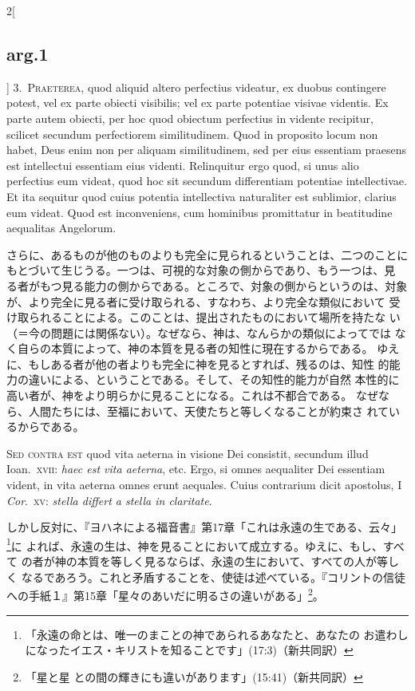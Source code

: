 \documentclass[paper=a4paper,fontsize=10pt,jafontsize=9pt,titlepage]{jlreq}
\begin{document}
\begin{paracol}{2}[\subsection{arg.1}]
3.~{\scshape Praeterea}, quod aliquid altero perfectius videatur, ex duobus
contingere potest, vel ex parte obiecti visibilis; vel ex parte
potentiae visivae videntis. Ex parte autem obiecti, per hoc quod
obiectum perfectius in vidente recipitur, scilicet secundum
perfectiorem similitudinem. Quod in proposito locum non habet, Deus
enim non per aliquam similitudinem, sed per eius essentiam praesens
est intellectui essentiam eius videnti. Relinquitur ergo quod, si unus
alio perfectius eum videat, quod hoc sit secundum differentiam
potentiae intellectivae. Et ita sequitur quod cuius potentia
intellectiva naturaliter est sublimior, clarius eum videat. Quod est
inconveniens, cum hominibus promittatur in beatitudine aequalitas
Angelorum.

\switchcolumn

さらに、あるものが他のものよりも完全に見られるということは、二つのことに
もとづいて生じうる。一つは、可視的な対象の側からであり、もう一つは、見
る者がもつ見る能力の側からである。ところで、対象の側からというのは、対象
が、より完全に見る者に受け取られる、すなわち、より完全な類似において
受け取られることによる。このことは、提出されたものにおいて場所を持たな
い（＝今の問題には関係ない）。なぜなら、神は、なんらかの類似によってでは
なく自らの本質によって、神の本質を見る者の知性に現在するからである。
ゆえに、もしある者が他の者よりも完全に神を見るとすれば、残るのは、知性
的能力の違いによる、ということである。そして、その知性的能力が自然
本性的に高い者が、神をより明らかに見ることになる。これは不都合である。
なぜなら、人間たちには、至福において、天使たちと等しくなることが約束さ
れているからである。

\switchcolumn*[\subsection{s.c.}]

{\scshape Sed contra est} quod vita aeterna in visione Dei consistit,
secundum illud Ioan.\ {\scshape xvii}: {\itshape haec est vita aeterna},
etc. Ergo, si omnes aequaliter Dei essentiam vident, in vita aeterna
omnes erunt aequales. Cuius contrarium dicit apostolus, I {\itshape Cor}.\
{\scshape xv}: {\itshape stella differt a stella in claritate}.

\switchcolumn

しかし反対に、『ヨハネによる福音書』第17章「これは永遠の生である、云々」
\footnote{「永遠の命とは、唯一のまことの神であられるあなたと、あなたの
お遣わしになったイエス・キリストを知ることです」(17:3)（新共同訳）}に
よれば、永遠の生は、神を見ることにおいて成立する。ゆえに、もし、すべて
の者が神の本質を等しく見るならば、永遠の生において、すべての人が等しく
なるであろう。これと矛盾することを、使徒は述べている。『コリントの信徒
への手紙１』第15章「星々のあいだに明るさの違いがある」\footnote{「星と星
との間の輝きにも違いがあります」(15:41)（新共同訳）}。


\end{paracol}
\end{document}

